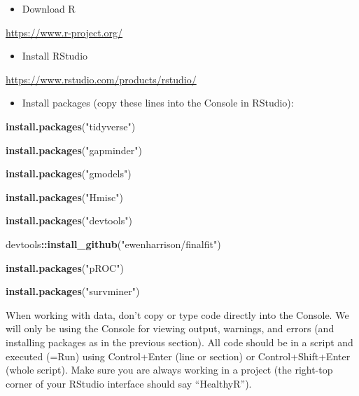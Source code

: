 \documentclass[12pt,]{krantz}
\makeatletter
\newenvironment{Shaded}{\begin{snugshade}}{\end{snugshade}}
\newcommand{\KeywordTok}[1]{\textcolor[rgb]{0.13,0.29,0.53}{\textbf{#1}}}
\newcommand{\NormalTok}[1]{#1}
\newcommand{\OperatorTok}[1]{\textcolor[rgb]{0.81,0.36,0.00}{\textbf{#1}}}
\newcommand{\StringTok}[1]{\textcolor[rgb]{0.31,0.60,0.02}{#1}}
\providecommand{\tightlist}{%
  \setlength{\itemsep}{0pt}\setlength{\parskip}{0pt}}
\newenvironment{kframe}{%
\medskip{}
\setlength{\fboxsep}{.8em}
 \def\at@end@of@kframe{}%
 \ifinner\ifhmode%
  \def\at@end@of@kframe{\end{minipage}}%
  \begin{minipage}{\columnwidth}%
 \fi\fi%
 \def\FrameCommand##1{\hskip\@totalleftmargin \hskip-\fboxsep
 \colorbox{shadecolor}{##1}\hskip-\fboxsep
     \hskip-\linewidth \hskip-\@totalleftmargin \hskip\columnwidth}%
 \MakeFramed {\advance\hsize-\width
   \@totalleftmargin\z@ \linewidth\hsize
   \@setminipage}}%
 {\par\unskip\endMakeFramed%
 \at@end@of@kframe}
\renewenvironment{Shaded}{\begin{kframe}}{\end{kframe}}
\theoremstyle{definition}
\theoremstyle{definition}
\theoremstyle{definition}
\theoremstyle{remark}
\makeatother
\begin{document}
\begin{itemize}
\tightlist
\item
  Download R
\end{itemize}

\url{https://www.r-project.org/}

\begin{itemize}
\tightlist
\item
  Install RStudio
\end{itemize}

\url{https://www.rstudio.com/products/rstudio/}

\begin{itemize}
\tightlist
\item
  Install packages (copy these lines into the Console in RStudio):
\end{itemize}

\begin{Shaded}
\begin{Highlighting}[]
\KeywordTok{install.packages}\NormalTok{(}\StringTok{"tidyverse"}\NormalTok{)}

\KeywordTok{install.packages}\NormalTok{(}\StringTok{"gapminder"}\NormalTok{)}

\KeywordTok{install.packages}\NormalTok{(}\StringTok{"gmodels"}\NormalTok{)}

\KeywordTok{install.packages}\NormalTok{(}\StringTok{"Hmisc"}\NormalTok{)}

\KeywordTok{install.packages}\NormalTok{(}\StringTok{"devtools"}\NormalTok{)}

\NormalTok{devtools}\OperatorTok{::}\KeywordTok{install_github}\NormalTok{(}\StringTok{"ewenharrison/finalfit"}\NormalTok{)}

\KeywordTok{install.packages}\NormalTok{(}\StringTok{"pROC"}\NormalTok{)}

\KeywordTok{install.packages}\NormalTok{(}\StringTok{"survminer"}\NormalTok{)}
\end{Highlighting}
\end{Shaded}

When working with data, don't copy or type code directly into the
Console. We will only be using the Console for viewing output, warnings,
and errors (and installing packages as in the previous section). All
code should be in a script and executed (=Run) using Control+Enter (line
or section) or Control+Shift+Enter (whole script). Make sure you are
always working in a project (the right-top corner of your RStudio
interface should say ``HealthyR'').
\end{document}
